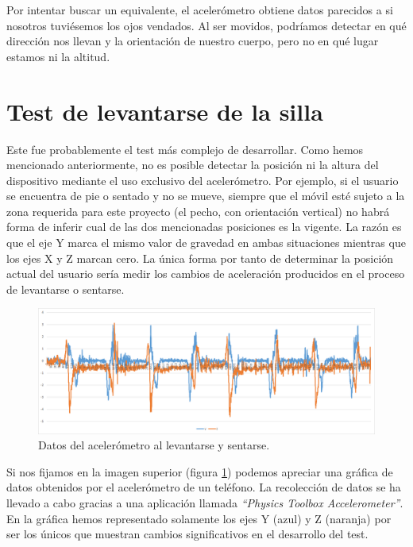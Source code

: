 Por intentar buscar un equivalente, el acelerómetro obtiene datos parecidos a si nosotros tuviésemos los ojos vendados. Al ser movidos, podríamos detectar en qué dirección nos llevan y la orientación de nuestro cuerpo, pero no en qué lugar estamos ni la altitud.

\section{Test de levantarse de la silla}

Este fue probablemente el test más complejo de desarrollar. Como hemos mencionado anteriormente, no es posible detectar la posición ni la altura del dispositivo mediante el uso exclusivo del acelerómetro. Por ejemplo, si el usuario se encuentra de pie o sentado y no se mueve, siempre que el móvil esté sujeto a la zona requerida para este proyecto (el pecho, con orientación vertical) no habrá forma de inferir cual de las dos mencionadas posiciones es la vigente. La razón es que el eje Y marca el mismo valor de gravedad en ambas situaciones mientras que los ejes X y Z marcan cero. La única forma por tanto de determinar la posición actual del usuario sería medir los cambios de aceleración producidos en el proceso de levantarse o sentarse. 

\begin{figure}[H]
	\centering
	\includegraphics[scale=0.395]{imagenes/grafico_completo_silla_vacio.png}
	\caption{Datos del acelerómetro al levantarse y sentarse.\label{fig:acc_1}}
\end{figure}

Si nos fijamos en la imagen superior (figura \ref{fig:acc_1}) podemos apreciar una gráfica de datos obtenidos por el acelerómetro de un teléfono. La recolección de datos se ha llevado a cabo gracias a una aplicación llamada \textit{``Physics Toolbox Accelerometer''}\cite{Vieyra}. En la gráfica hemos representado solamente los ejes Y (azul) y Z (naranja) por ser los únicos que muestran cambios significativos en el desarrollo del test.

